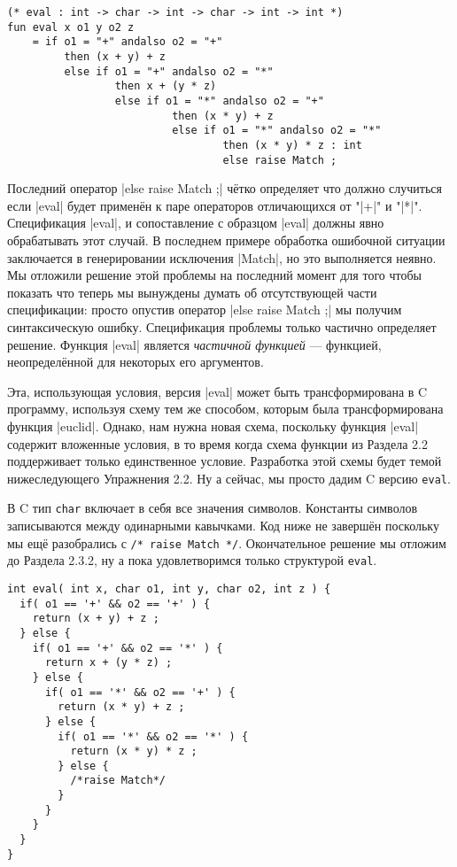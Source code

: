 \begin{lstlisting}[style=customml]
(* eval : int -> char -> int -> char -> int -> int *)
fun eval x o1 y o2 z
    = if o1 = "+" andalso o2 = "+"
         then (x + y) + z
         else if o1 = "+" andalso o2 = "*"
                 then x + (y * z)
                 else if o1 = "*" andalso o2 = "+"
                          then (x * y) + z
                          else if o1 = "*" andalso o2 = "*"
                                  then (x * y) * z : int
                                  else raise Match ;
\end{lstlisting}

Последний оператор \inline|else raise Match ;| чётко определяет что должно случиться если \inline|eval| будет применён к паре операторов отличающихся от "\inline|+|" и "\inline|*|". Спецификация \inline|eval|, и сопоставление с образцом \inline|eval| должны явно обрабатывать этот случай. В последнем примере обработка ошибочной ситуации заключается в генерировании исключения \inline|Match|, но это выполняется неявно. Мы отложили решение этой проблемы на последний момент для того чтобы показать что теперь мы вынуждены думать об отсутствующей части спецификации: просто опустив оператор \inline|else raise Match ;| мы получим синтаксическую ошибку. Спецификация проблемы только частично определяет решение. Функция \inline|eval| является \emph{частичной функцией} --- функцией, неопределённой для некоторых его аргументов.

Эта, использующая условия, версия \inline|eval| может быть трансформирована в C программу, используя схему тем же способом, которым была трансформирована функция \inline|euclid|. Однако, нам нужна новая схема, поскольку функция \inline|eval| содержит вложенные условия, в то время когда схема функции из Раздела 2.2 поддерживает только единственное условие. Разработка этой схемы будет темой нижеследующего Упражнения 2.2. Ну а сейчас, мы просто дадим C версию \lstinline|eval|.

В C тип \lstinline|char| включает в себя все значения символов. Константы символов записываются между одинарными кавычками. Код ниже не завершён поскольку мы ещё разобрались с \lstinline|/* raise Match */|. Окончательное решение мы отложим до Раздела 2.3.2, ну а пока удовлетворимся только структурой \lstinline|eval|.

\begin{lstlisting}
int eval( int x, char o1, int y, char o2, int z ) {
  if( o1 == '+' && o2 == '+' ) {
    return (x + y) + z ;
  } else {
    if( o1 == '+' && o2 == '*' ) {
      return x + (y * z) ;
    } else {
      if( o1 == '*' && o2 == '+' ) {
        return (x * y) + z ;
      } else {
        if( o1 == '*' && o2 == '*' ) {
          return (x * y) * z ;
        } else {
          /*raise Match*/
        }
      }
    }
  }
}
\end{lstlisting}

